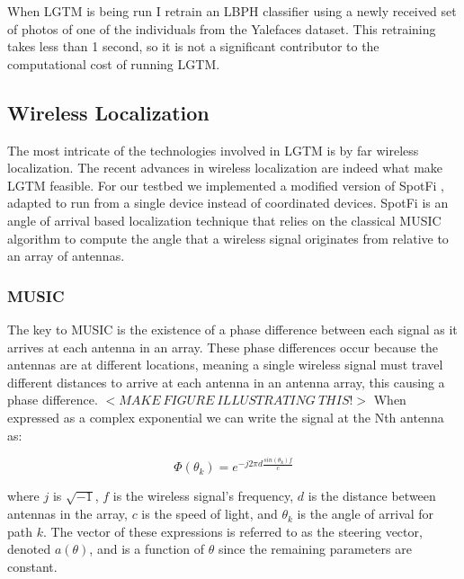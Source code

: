 \documentclass[12pt]{report}
\begin{document}
When LGTM is being run I retrain an LBPH classifier using a newly received set of photos of one of the individuals from the Yalefaces dataset. This retraining takes less than 1 second, so it is not a significant contributor to the computational cost of running LGTM. \par

\subsection{Wireless Localization}
The most intricate of the technologies involved in LGTM is by far wireless localization. The recent advances in wireless localization \cite{UbicarseKumar2014,SpotFiKotaru2015,ChronosSingleAPLocalizationVasisht2016} are indeed what make LGTM feasible. For our testbed we implemented a modified version of SpotFi \cite{SpotFiKotaru2015}, adapted to run from a single device instead of coordinated devices. SpotFi is an angle of arrival based localization technique that relies on the classical MUSIC algorithm \cite{MUSICSchmidt1986} to compute the angle that a wireless signal originates from relative to an array of antennas. 

\subsubsection{MUSIC}
The key to MUSIC is the existence of a phase difference between each signal as it arrives at each antenna in an array. These phase differences occur because the antennas are at different locations, meaning a single wireless signal must travel different distances to arrive at each antenna in an antenna array, this causing a phase difference. $<MAKE \: FIGURE \: ILLUSTRATING \: THIS!>$  When expressed as a complex exponential we can write the signal at the Nth antenna as:

$$\Phi(\theta_{k}) = e^{-j 2 \pi d \frac{sin(\theta_{k}) f}{c}}$$

where $j$ is $\sqrt{-1}$, $f$ is the wireless signal's frequency, $d$ is the distance between antennas in the array, $c$ is the speed of light, and $\theta_k$ is the angle of arrival for path $k$. The vector of these expressions is referred to as the steering vector, denoted $a(\theta)$, and is a function of $\theta$ since the remaining parameters are constant. \par
\end{document}
